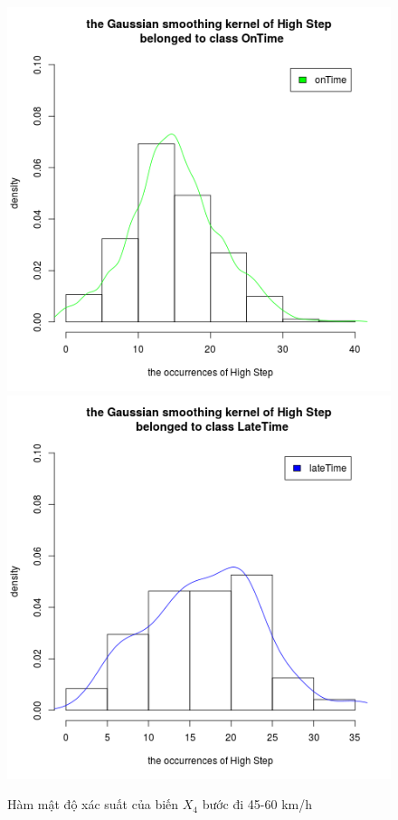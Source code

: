 \documentclass[a4paper, 13pt]{report}
\begin{document}
\FloatBarrier
\begin{figure}[!htb]
  \includegraphics[width=\linewidth]{DensityHighStep_OnTime}
\endminipage
{}
  \includegraphics[width=\linewidth]{DensityHighStep_LateTime}
\endminipage
\caption*{Hàm mật độ xác suất của biến $X_4$ bước đi 45-60 km/h}
\end{figure}
\end{document}
